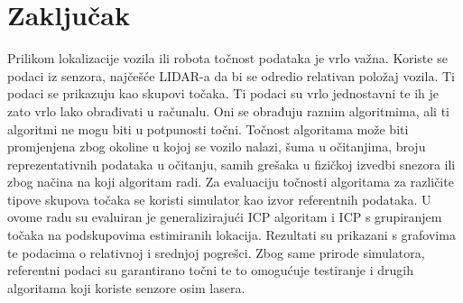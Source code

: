 \chapter{Zaključak}
Prilikom lokalizacije vozila ili robota točnost podataka je vrlo važna. Koriste se podaci iz senzora, najčešće LIDAR-a da bi se odredio relativan položaj vozila. Ti podaci se prikazuju kao skupovi točaka. Ti podaci su vrlo jednostavni te ih je zato vrlo lako obrađivati u računalu. Oni se obrađuju raznim algoritmima, ali ti algoritmi ne mogu biti u potpunosti točni. Točnost algoritama može biti promjenjena zbog okoline u kojoj se vozilo nalazi, šuma u očitanjima, broju reprezentativnih podataka u očitanju, samih grešaka u fizičkoj izvedbi snezora ili zbog načina na koji algoritam radi. Za evaluaciju točnosti algoritama za različite tipove skupova točaka se koristi simulator kao izvor referentnih podataka. U ovome radu su evaluiran je generalizirajući ICP algoritam i ICP s grupiranjem točaka na podskupovima estimiranih lokacija. Rezultati su prikazani s grafovima te podacima o relativnoj i srednjoj pogrešci. Zbog same prirode simulatora, referentni podaci su garantirano točni te to omogućuje testiranje i drugih algoritama koji koriste senzore osim lasera.